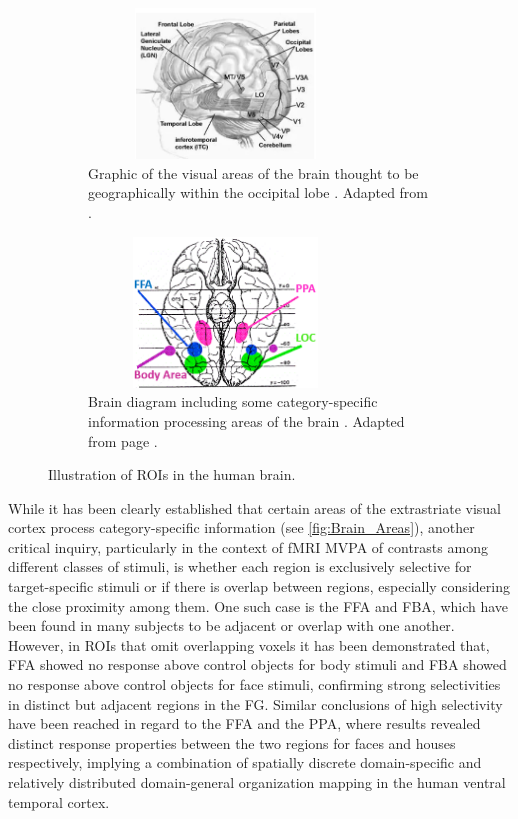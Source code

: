 \begin{figure}[htbp]
 	\centering
	\begin{subfigure}{0.49\textwidth}
		\centering
		\includegraphics[width = 0.8\textwidth, height = 4cm]{assets/images/visual_areas.png}
		\caption{Graphic of the visual areas of the brain thought to be geographically within the occipital lobe \cite{visual_centers}. Adapted from .}
		\label{fig:Visual_areas}
	\end{subfigure}
	\hfill
	\begin{subfigure}{0.49\textwidth}
		\centering
	 	\includegraphics[width = 0.8\textwidth, height = 4cm]{assets/images/brain_areas.png}
		\caption{Brain diagram including some category-specific information processing areas of the brain \cite{prosopagnosia}. Adapted from page \cite{brain_areas}.}
		\label{fig:Specific_areas}
	\end{subfigure}
	\caption[Brain Regions of Interest]{Illustration of \gls{ROIs} in the human brain.}
 	\label{fig:Brain_Areas}
\end{figure}

While it has been clearly established that certain areas of the extrastriate visual cortex process category-specific information (see \autoref{fig:Brain_Areas}), another critical inquiry, particularly in the context of \gls{fMRI} \gls{MVPA} of contrasts among different classes of stimuli, is whether each region is exclusively selective for target-specific stimuli or if there is overlap between regions, especially considering the close proximity among them. One such case is the \gls{FFA} and \gls{FBA}, which have been found in many subjects to be adjacent or overlap with one another. However, in \gls{ROIs} that omit overlapping voxels it has been demonstrated \cite{Schwarzlose2005} that, \gls{FFA} showed no response above control objects for body stimuli and \gls{FBA} showed no response above control objects for face stimuli, confirming strong selectivities in distinct but adjacent regions in the \gls{FG}. Similar conclusions of high selectivity have been reached \cite{Mengjin2022} in regard to the \gls{FFA} and the \gls{PPA}, where results revealed distinct response properties between the two regions for faces and houses respectively, implying a combination of spatially discrete domain-specific and relatively distributed domain-general organization mapping in the human ventral temporal cortex.

